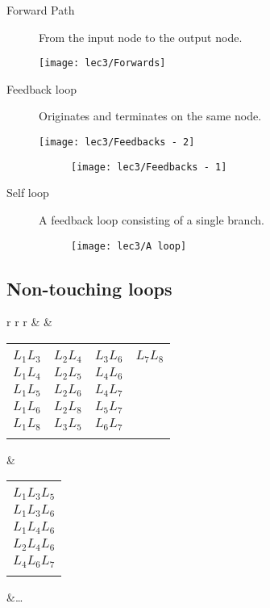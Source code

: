 \begin{description}
	\item[Forward Path]  From the input node to the output node.
		\begin{marginfigure}[-0.4233401538135892cm]
			\texttt{[image: lec3/Forwards]}
		\end{marginfigure}
	\vspace{2.7 cm}
	
	\item[Feedback loop]  Originates and terminates on the same node.
		\begin{marginfigure}[+0.4233401538135892cm]
			\texttt{[image: lec3/Feedbacks - 2]} 
		\end{marginfigure}
		\begin{figure}[h]
			\raggedleft
			\texttt{[image: lec3/Feedbacks - 1]}
		\end{figure}
	
	\item[Self loop]  A feedback loop consisting of a single branch.
		\begin{figure}[!h]
			\raggedleft
			\texttt{[image: lec3/A loop]}
		\end{figure}
		
\end{description}

\subsection{Non-touching loops}

\raggedright
\begin{tabular}{r r r}
	 &  &  \\
	\raggedright
	\begin{tabular}{| c | c | c | c |}
	        \multicolumn{4}{c}{}\\[-1em]
	        $L_1L_3$ & $L_2L_4$ & $L_3L_6$ & $L_7L_8$\\
	        $L_1L_4$ & $L_2L_5$ & $L_4L_6$ &\\
	        $L_1L_5$ & $L_2L_6$ & $L_4L_7$ &\\
	        $L_1L_6$ & $L_2L_8$ & $L_5L_7$ &\\
	        $L_1L_8$ & $L_3L_5$ & $L_6L_7$ &\\
	        \multicolumn{4}{c}{}\\[-1em]
	\end{tabular}&
	\raggedright
	\begin{tabular}{|c|}
	        \multicolumn{1}{c}{}\\[-1em]
	        $L_1L_3L_5$ \\
			$L_1L_3L_6$ \\
			$L_1L_4L_6$ \\
			$L_2L_4L_6$ \\
			$L_4L_6L_7$ \\
	        \multicolumn{1}{c}{}\\[-1em]
	\end{tabular}&\ldots\\
\end{tabular}

